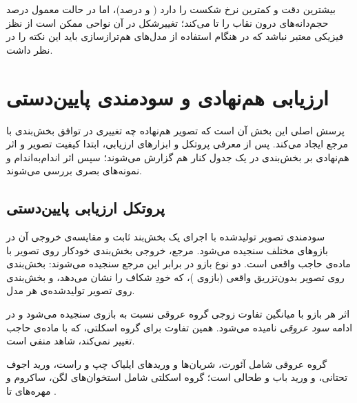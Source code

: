  بیشترین دقت و کمترین نرخ شکست را دارد ( و  درصد)، اما در حالت معمول  درصد حجم‌دانه‌های درون نقاب را تا می‌کند؛ تغییرشکل در آن نواحی 
ممکن است از نظز فیزیکی معتبر نباشد که در هنگام استفاده از مدل‌های هم‌ترازسازی باید این نکته را در نظر داشت.

\section{ارزیابی هم‌نهادی و سودمندی پایین‌دستی}
\label{sec:e-syn}

پرسش اصلی این بخش آن است که تصویر هم‌نهاده چه تغییری در توافق بخش‌بندی با مرجع ایجاد می‌کند. پس از معرفی پروتکل و ابزارهای ارزیابی، ابتدا کیفیت تصویر و اثر هم‌نهادی بر بخش‌بندی در یک جدول کنار هم گزارش می‌شوند؛ سپس اثر اندام‌به‌اندام و نمونه‌های بصری بررسی می‌شوند.

\subsection{پروتکل ارزیابی پایین‌دستی}
\label{sec:e-syn-protocol}

\label{sec:m-downstream}


سودمندی تصویر تولیدشده با اجرای یک بخش‌بند ثابت و مقایسه‌ی خروجی آن در بازوهای مختلف سنجیده می‌شود.
مرجع، خروجی بخش‌بندی خودکار روی تصویر با ماده‌ی حاجب واقعی است. دو نوع بازو در برابر این مرجع سنجیده می‌شوند: بخش‌بندی روی تصویر بدون‌تزریق واقعی (بازوی )، که خودِ شکاف را نشان می‌دهد، و بخش‌بندی روی تصویر تولیدشده‌ی هر مدل.

اثر هر بازو با میانگین تفاوت زوجی  گروه عروقی نسبت به بازوی  سنجیده می‌شود و در ادامه \emph{سود عروقی} نامیده می‌شود. همین تفاوت برای گروه اسکلتی، که با ماده‌ی حاجب تغییر نمی‌کند، شاهد منفی است.

 گروه عروقی شامل آئورت، شریان‌ها و وریدهای ایلیاک چپ و راست، ورید اجوف تحتانی، و ورید باب و طحالی است؛ گروه اسکلتی شامل استخوان‌های لگن، ساکروم و مهره‌های  تا .



